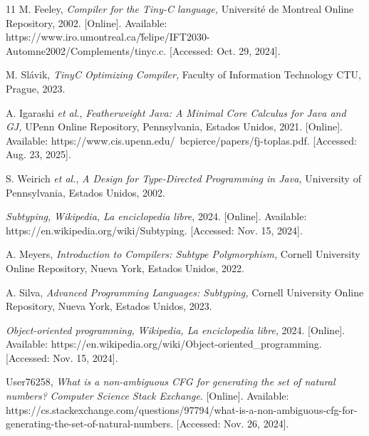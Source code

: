 \begin{thebibliography}{11}
    \label{sec:126}
    \hypertarget{126}{}
    M. Feeley, \textit{Compiler for the Tiny-C language, } Université de Montreal Online Repository, 2002. [Online]. Available: https://www.iro.umontreal.ca/\~felipe/IFT2030-Automne2002/Complements/tinyc.c. [Accessed: Oct. 29, 2024].

    \label{sec:127}
    \hypertarget{127}{}
    M. Slávik, \textit{TinyC Optimizing Compiler, } Faculty of Information Technology CTU, Prague, 2023.

    \label{sec:128}
    \hypertarget{128}{}
    A. Igarashi \textit{et al.}, \textit{Featherweight Java: A Minimal Core Calculus for Java and GJ, } UPenn Online Repository, Pennsylvania, Estados Unidos, 2021. [Online]. Available: https://www.cis.upenn.edu/~bcpierce/papers/fj-toplas.pdf. [Accessed: Aug. 23, 2025].

    \label{sec:129}
    \hypertarget{129}{}
    S. Weirich \textit{et al.}, \textit{A Design for Type-Directed Programming in Java, } University of Pennsylvania, Estados Unidos, 2002.

    \label{sec:130}
    \hypertarget{130}{}
    \textit{Subtyping, }\textit{Wikipedia, La enciclopedia libre}, 2024. [Online]. Available: https://en.wikipedia.org/wiki/Subtyping. [Accessed: Nov. 15, 2024].

    \label{sec:131}
    \hypertarget{131}{}
    A. Meyers, \textit{Introduction to Compilers: Subtype Polymorphism, } Cornell University Online Repository, Nueva York, Estados Unidos, 2022.

    \label{sec:132}
    \hypertarget{132}{}
    A. Silva, \textit{Advanced Programming Languages: Subtyping, } Cornell University Online Repository, Nueva York, Estados Unidos, 2023.

    \label{sec:133}
    \hypertarget{133}{}
    \textit{Object-oriented programming, } \textit{Wikipedia, La enciclopedia libre}, 2024. [Online]. Available: https://en.wikipedia.org/wiki/Object-oriented\_programming. [Accessed: Nov. 15, 2024].

    \label{sec:134}
    \hypertarget{134}{}
    User76258, \textit{What is a non-ambiguous CFG for generating the set of natural numbers? } \textit{Computer Science Stack Exchange}. [Online]. Available: https://cs.stackexchange.com/questions/97794/what-is-a-non-ambiguous-cfg-for-generating-the-set-of-natural-numbers. [Accessed: Nov. 26, 2024].


\end{thebibliography}
